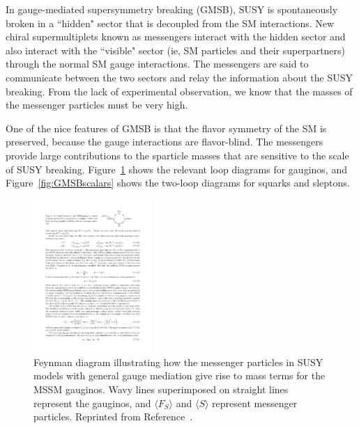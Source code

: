 In gauge-mediated supersymmetry breaking (GMSB), SUSY is spontaneously broken in a ``hidden" sector that is decoupled from the SM interactions. 
New chiral supermultiplets known as messengers interact with the hidden sector and 
also interact with the ``visible" sector (ie, SM particles and their superpartners) through the normal
SM gauge interactions. The messengers are said to communicate between the two sectors and relay the information about the SUSY breaking.
From the lack of experimental observation, we know that the masses of the messenger particles must be very high. 

One of the nice features of GMSB is that the flavor symmetry of the SM is preserved, because the gauge interactions are flavor-blind. 
The messengers provide large contributions to the sparticle masses that are sensitive to the scale of SUSY breaking. 
Figure~\ref{fig:GMSBgaugino} shows the relevant loop diagrams for gauginos, and Figure~\ref{fig:GMSBscalars}
shows the two-loop diagrams for squarks and sleptons.

\begin{figure}[htbp]
    \centering
    \includegraphics[width=0.4\textwidth]{Figures/Theory/GMSBgaugino.pdf}
    \caption[Feynman diagram illustrating how the messenger particles in SUSY models
    with general gauge mediation give rise to mass terms for the MSSM gauginos.]
    {Feynman diagram illustrating how the messenger particles in SUSY models
    with general gauge mediation give rise to mass terms for the MSSM gauginos. 
    Wavy lines superimposed on straight lines represent the gauginos, and 
    $\langle F_S \rangle$ and $\langle S \rangle$ represent messenger particles.
    Reprinted from Reference~\cite{SUSYprimer}.}
    \label{fig:GMSBgaugino}
\end{figure}

